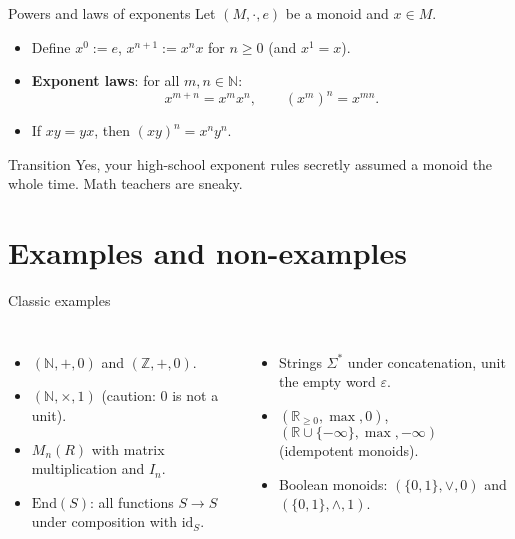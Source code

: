 \documentclass[aspectratio=169,11pt]{beamer}
\newcommand{\NN}{\mathbb{N}}
\newcommand{\ZZ}{\mathbb{Z}}
\newcommand{\RR}{\mathbb{R}}
\newcommand{\id}{\mathrm{id}}
\begin{document}
\begin{frame}{Powers and laws of exponents}
Let $(M,\cdot,e)$ be a monoid and $x\in M$.
\begin{itemize}
  \item Define $x^0:=e$, $x^{n+1}:=x^n x$ for $n\ge 0$ (and $x^1=x$).
  \item \textbf{Exponent laws}: for all $m,n\in \NN$:
  \[
    x^{m+n}=x^m x^n,\qquad (x^m)^n=x^{mn}.
  \]
  \item If $xy=yx$, then $(xy)^n=x^n y^n$.
\end{itemize}
\begin{block}{Transition}
Yes, your high-school exponent rules secretly assumed a monoid the whole time. Math teachers are sneaky.
\end{block}
\end{frame}

\section{Examples and non-examples}
\begin{frame}{Classic examples}
\begin{columns}[T,onlytextwidth]
\begin{itemize}
  \item $(\NN,+,0)$ and $(\ZZ,+,0)$.
  \item $(\NN,\times,1)$ (caution: $0$ is not a unit).
  \item $M_n(R)$ with matrix multiplication and $I_n$.
  \item $\mathrm{End}(S)$: all functions $S\to S$ under composition with $\id_S$.
\end{itemize}
\begin{itemize}
  \item Strings $\Sigma^\ast$ under concatenation, unit the empty word $\varepsilon$.
  \item $(\RR_{\ge 0},\max,0)$, $(\RR\cup\{-\infty\},\max,-\infty)$ (idempotent monoids).
  \item Boolean monoids: $(\{0,1\},\lor,0)$ and $(\{0,1\},\land,1)$.
\end{itemize}
\end{columns}
\end{frame}
\end{document}
